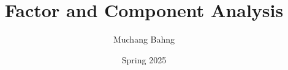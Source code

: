 \documentclass{article}
\begin{document}
\title{Factor and Component Analysis}
\author{Muchang Bahng}
\date{Spring 2025}

\maketitle
\tableofcontents
\pagebreak



















\end{document}
